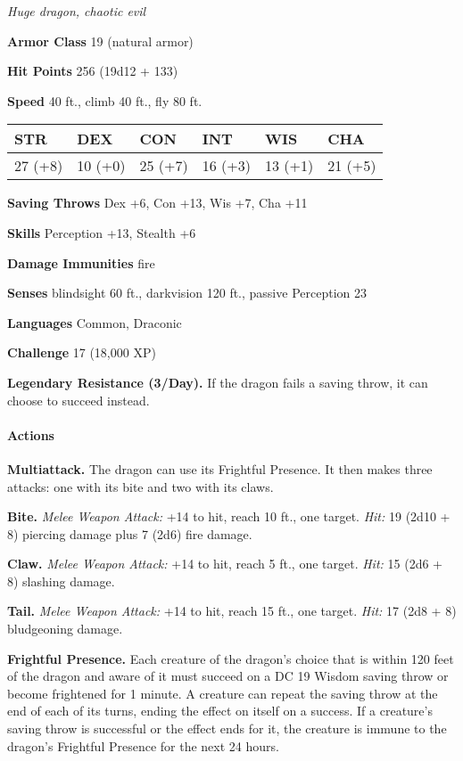 \documentclass[
]{article}
\begin{document}
\emph{Huge dragon, chaotic evil}

\textbf{Armor Class} 19 (natural armor)

\textbf{Hit Points} 256 (19d12 + 133)

\textbf{Speed} 40 ft., climb 40 ft., fly 80 ft.

\begin{longtable}[]{@{}llllll@{}}
\toprule
STR & DEX & CON & INT & WIS & CHA\tabularnewline
\midrule
\endhead
27 (+8) & 10 (+0) & 25 (+7) & 16 (+3) & 13 (+1) & 21 (+5)\tabularnewline
\bottomrule
\end{longtable}

\textbf{Saving Throws} Dex +6, Con +13, Wis +7, Cha +11

\textbf{Skills} Perception +13, Stealth +6

\textbf{Damage Immunities} fire

\textbf{Senses} blindsight 60 ft., darkvision 120 ft., passive
Perception 23

\textbf{Languages} Common, Draconic

\textbf{Challenge} 17 (18,000 XP)

\textbf{Legendary Resistance (3/Day).} If the dragon fails a saving
throw, it can choose to succeed instead.

\hypertarget{actions-36}{%
\paragraph{Actions}\label{actions-36}}

\textbf{Multiattack.} The dragon can use its Frightful Presence. It then
makes three attacks: one with its bite and two with its claws.

\textbf{Bite.} \emph{Melee Weapon Attack:} +14 to hit, reach 10 ft., one
target. \emph{Hit:} 19 (2d10 + 8) piercing damage plus 7 (2d6) fire
damage.

\textbf{Claw.} \emph{Melee Weapon Attack:} +14 to hit, reach 5 ft., one
target. \emph{Hit:} 15 (2d6 + 8) slashing damage.

\textbf{Tail.} \emph{Melee Weapon Attack:} +14 to hit, reach 15 ft., one
target. \emph{Hit:} 17 (2d8 + 8) bludgeoning damage.

\textbf{Frightful Presence.} Each creature of the dragon's choice that
is within 120 feet of the dragon and aware of it must succeed on a DC 19
Wisdom saving throw or become frightened for 1 minute. A creature can
repeat the saving throw at the end of each of its turns, ending the
effect on itself on a success. If a creature's saving throw is
successful or the effect ends for it, the creature is immune to the
dragon's Frightful Presence for the next 24 hours.
\end{document}
